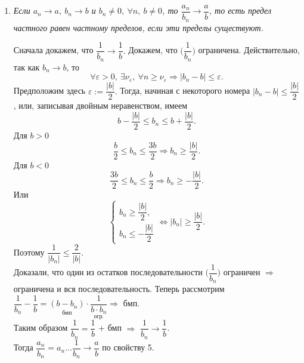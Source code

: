 \begin{enumerate}
\begin{Proof}
	\end{Proof}
	\item \textit{Если $a_n \to a,\ b_n \to b$ и $b_n \neq 0,\ \forall n ,\ b \neq 0$, то $\dfrac {a_n}{b_n} \to \dfrac {a} {b} $, то есть предел частного равен частному пределов, если эти пределы существуют.}
	\begin{Proof}
		Сначала докажем, что $\dfrac {1}{b_n} \to \dfrac {1}{b}.$ Докажем, что $\Big(\dfrac {1}{b_n}\Big)$ ограничена. Действительно, так как $b_n \to b$, то $$\forall \varepsilon > 0,\ \exists \nu_\varepsilon,\ \forall n \geqslant \nu_\varepsilon \Rightarrow |b_n - b| \leqslant \varepsilon.$$
		Предположим здесь $\varepsilon:=\dfrac{|b|}{2}.$ Тогда, начиная с некоторого номера $|b_n-b|\leqslant\dfrac{|b|}{2}$, или, записывая двойным неравенством, имеем $$b-\dfrac{|b|}{2}\leqslant b_n\leqslant b+\dfrac{|b|}{2}.$$
		Для $b> 0$ $$\dfrac{b}{2}\leqslant b_n \leqslant \dfrac{3b}{2}\Rightarrow b_n \geqslant \dfrac{|b|}{2}.$$
		Для $b< 0$ $$\dfrac{3b}{2}\leqslant b_n \leqslant \dfrac{b}{2}\Rightarrow b_n \geqslant -\dfrac{|b|}{2}.$$
		Или
		$$\begin{cases}
			b_n \geqslant \dfrac {|b|}{2},\\
			b_n \leqslant -\dfrac {|b|}{2}
		\end{cases}  \Longleftrightarrow |b_n| \geqslant \dfrac {|b|}{2}.$$
		Поэтому $\dfrac {1}{|b_n|} \leqslant \dfrac {2}{|b|}$.\\
		Доказали, что один из остатков последовательности $\Big(\dfrac {1}{b_n}\Big)$ ограничен $\Rightarrow$ ограничена и вся последовательность.
		Теперь рассмотрим $\dfrac {1}{b_n} - \dfrac {1}{b}=\underset{\text{бмп}}{(b-b_n)}\cdot\dfrac {1}{\underset{\text{огр.}}{b\cdot b_n}} \Rightarrow$ бмп.\\
		Таким образом $\dfrac {1}{b_n} = \dfrac {1}{b}$ + бмп $\Rightarrow$ $\dfrac {1}{b_n} \to \dfrac {1}{b}$.\\
		Тогда $\dfrac {a_n}{b_n}=a_n\dots\dfrac {1}{b_n}\to \dfrac {a}{b}$ по свойству 5.
	\end{Proof}
\end{enumerate}
